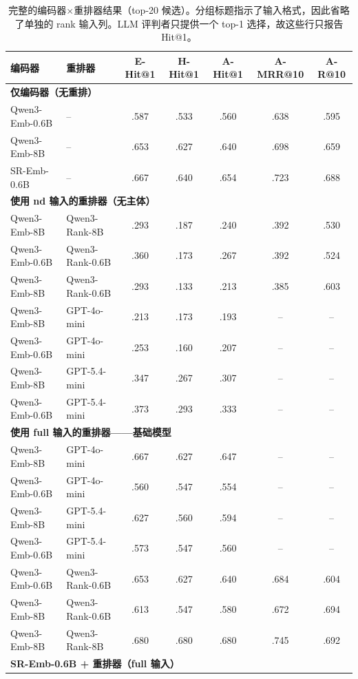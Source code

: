 \documentclass[11pt,UTF8,fontset=fandol]{ctexart}
\makeatletter
\newcommand{\Hit}{Hit@1}
\makeatother
\begin{document}
\begin{table}[H]\centering
\caption{完整的编码器$\times$重排器结果（top-20 候选）。分组标题指示了输入格式，因此省略了单独的 rank 输入列。LLM 评判者只提供一个 top-1 选择，故这些行只报告 \Hit{}。}
\small
\begin{tabular}{llccccc}
\toprule
编码器 & 重排器 & E-\Hit{} & H-\Hit{} & A-\Hit{} & A-MRR@10 & A-R@10 \\ \midrule
\multicolumn{7}{l}{\textbf{仅编码器（无重排）}} \\
Qwen3-Emb-0.6B & -- & .587 & .533 & .560 & .638 & .595 \\
Qwen3-Emb-8B & -- & .653 & .627 & .640 & .698 & .659 \\
SR-Emb-0.6B & -- & .667 & .640 & .654 & .723 & .688 \\
\multicolumn{7}{l}{\textbf{使用 nd 输入的重排器（无主体）}} \\
Qwen3-Emb-8B & Qwen3-Rank-8B & .293 & .187 & .240 & .392 & .530 \\
Qwen3-Emb-0.6B & Qwen3-Rank-0.6B & .360 & .173 & .267 & .392 & .524 \\
Qwen3-Emb-8B & Qwen3-Rank-0.6B & .293 & .133 & .213 & .385 & .603 \\
Qwen3-Emb-8B & GPT-4o-mini & .213 & .173 & .193 & -- & -- \\
Qwen3-Emb-0.6B & GPT-4o-mini & .253 & .160 & .207 & -- & -- \\
Qwen3-Emb-8B & GPT-5.4-mini & .347 & .267 & .307 & -- & -- \\
Qwen3-Emb-0.6B & GPT-5.4-mini & .373 & .293 & .333 & -- & -- \\
\multicolumn{7}{l}{\textbf{使用 full 输入的重排器——基础模型}} \\
Qwen3-Emb-8B & GPT-4o-mini & .667 & .627 & .647 & -- & -- \\
Qwen3-Emb-0.6B & GPT-4o-mini & .560 & .547 & .554 & -- & -- \\
Qwen3-Emb-8B & GPT-5.4-mini & .627 & .560 & .594 & -- & -- \\
Qwen3-Emb-0.6B & GPT-5.4-mini & .573 & .547 & .560 & -- & -- \\
Qwen3-Emb-0.6B & Qwen3-Rank-0.6B & .653 & .627 & .640 & .684 & .604 \\
Qwen3-Emb-8B & Qwen3-Rank-0.6B & .613 & .547 & .580 & .672 & .694 \\
Qwen3-Emb-8B & Qwen3-Rank-8B & .680 & .680 & .680 & .745 & .692 \\
\multicolumn{7}{l}{\textbf{SR-Emb-0.6B + 重排器（full 输入）}} \\

\end{tabular}
\end{table}
\end{document}
